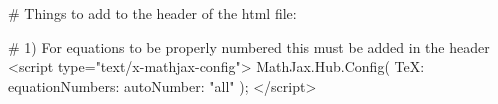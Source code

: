 # Things to add to the header of the html file:

 # 1) For equations to be properly numbered this must be added in the header
 <script type="text/x-mathjax-config">
    MathJax.Hub.Config({ TeX: { equationNumbers: {autoNumber: "all"} } });
 </script>

